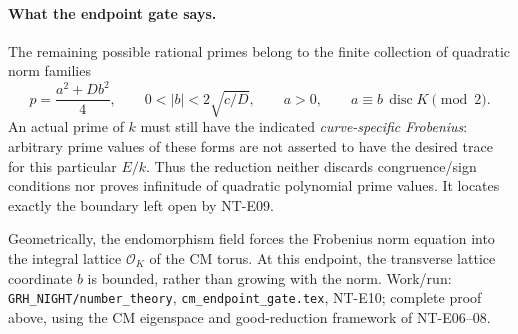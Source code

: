 \paragraph{What the endpoint gate says.}
The remaining possible rational primes belong to the finite
collection of quadratic norm families
\[
 p=\frac{a^2+Db^2}{4},\qquad
 0<|b|<2\sqrt{c/D},\qquad
 a>0,\qquad a\equiv b\,\operatorname{disc}K\pmod2.        \tag{NT-E10g}
\]
An actual prime of $k$ must still have the indicated
\emph{curve-specific Frobenius}: arbitrary prime values of these
forms are not asserted to have the desired trace for this
particular $E/k$. Thus the reduction neither discards
congruence/sign conditions nor proves infinitude of quadratic
polynomial prime values. It locates exactly the boundary left
open by NT-E09.

Geometrically, the endomorphism field forces the Frobenius norm
equation into the integral lattice $\mathcal O_K$ of the CM
torus. At this endpoint, the transverse lattice coordinate $b$
is bounded, rather than growing with the norm. Work/run:
\texttt{GRH\_NIGHT/number\_theory},
\texttt{cm\_endpoint\_gate.tex}, NT-E10; complete proof above,
using the CM eigenspace and good-reduction framework of NT-E06--08.

